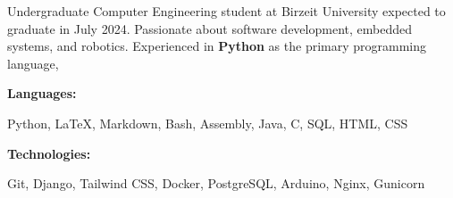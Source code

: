 \documentclass[9pt]{developercv} %
\begin{document}
\begin{minipage}[t]{0.46\textwidth}
	\vspace{-6pt}
 
    Undergraduate Computer Engineering student at Birzeit University expected to graduate in July 2024. Passionate about software development, embedded systems, and robotics. Experienced in \textbf{Python} as the primary programming language, 
\end{minipage}
\hfill %
\begin{minipage}[t]{0.465\textwidth}
    \vspace{-6pt}
    
    \begin{minipage}[t]{0.2\textwidth}
        \textbf{Languages:}
    \end{minipage}
    \hfill
    \begin{minipage}[t]{0.73\textwidth}
        Python, LaTeX, Markdown, Bash, Assembly, Java, C, SQL, HTML, CSS
    \end{minipage}
    \vspace{4mm}
    
    \begin{minipage}[t]{0.2\textwidth}
        \textbf{Technologies:}
    \end{minipage}
    \hfill
    \begin{minipage}[t]{0.73\textwidth}
        Git, Django, Tailwind CSS, Docker, PostgreSQL, Arduino, Nginx, Gunicorn
    \end{minipage}
    
    
\end{minipage}
\end{document}

